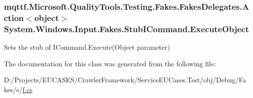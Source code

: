 \hypertarget{class_system_1_1_windows_1_1_input_1_1_fakes_1_1_stub_i_command_a1ea12794f160693dce126205bf34394e}{
\subsubsection[{Execute\-Object}]{\setlength{\rightskip}{0pt plus 5cm}mqttf.\-Microsoft.\-Quality\-Tools.\-Testing.\-Fakes.\-Fakes\-Delegates.\-Action$<$object$>$ System.\-Windows.\-Input.\-Fakes.\-Stub\-I\-Command.\-Execute\-Object}}\label{class_system_1_1_windows_1_1_input_1_1_fakes_1_1_stub_i_command_a1ea12794f160693dce126205bf34394e}


Sets the stub of I\-Command.\-Execute(\-Object parameter)



The documentation for this class was generated from the following file\-:\begin{DoxyCompactItemize}
\item 
D\-:/\-Projects/\-E\-U\-C\-A\-S\-E\-S/\-Crawler\-Framework/\-Service\-E\-U\-Cases.\-Test/obj/\-Debug/\-Fakes/s/\hyperlink{s_2f_8cs}{f.\-cs}\end{DoxyCompactItemize}
